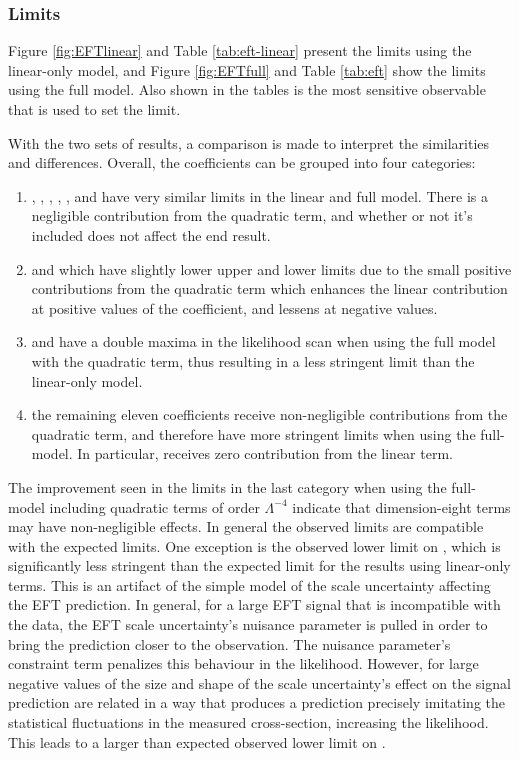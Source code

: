 \subsubsection{Limits}
Figure \ref{fig:EFTlinear} and Table \ref{tab:eft-linear} present the limits using the linear-only model, and Figure \ref{fig:EFTfull} and Table \ref{tab:eft} show the limits using the full model. Also shown in the tables is the most sensitive observable that is used to set the limit.

With the two sets of results, a comparison is made to interpret the similarities and differences. Overall, the coefficients can be grouped into four categories:
\begin{enumerate}
    \item \chdd, \chwb, \che, \chlone, \chqthr{}, \chlthr{} and \cllone{} have very similar limits in the linear and full model. There is a negligible contribution from the quadratic term, and whether or not it's included does not affect the end result. 
    \item \chqone{} and \clqthr{} which have slightly lower upper and lower limits  due to the small positive contributions from the quadratic term which enhances the linear contribution at positive values of the coefficient, and lessens at negative values.
    \item \chg{} and \chu have a double maxima in the likelihood scan when using the full model with the quadratic term, thus resulting in a less stringent limit than the linear-only model.
    \item the remaining eleven coefficients receive non-negligible contributions from the quadratic term, and therefore have more stringent limits when using the full-model. In particular, \chgtil{} receives zero contribution from the linear term.
\end{enumerate}
The improvement seen in the limits in the last category when using the full-model including quadratic terms of order $\Lambda^{-4}$ indicate that dimension-eight terms may have non-negligible effects.
In general the observed limits are compatible with the expected
limits.
One  exception is  the observed lower limit on \clqone{}, which is significantly less stringent than
the expected limit for the results using linear-only terms.  This is an artifact of the simple model of the scale uncertainty affecting
the EFT prediction.
In general, for a large EFT signal that is incompatible with the data,
the EFT scale uncertainty's nuisance parameter is pulled in order to
bring the prediction closer to the observation. The nuisance parameter's constraint term 
penalizes this behaviour in the likelihood.
However, for large negative values of \clqone{} the size and shape of
the scale uncertainty's effect on the signal prediction
are related in a way that produces a prediction precisely imitating the
statistical fluctuations in the measured cross-section, increasing the likelihood.
This leads to a larger than expected observed lower limit on \clqone.

